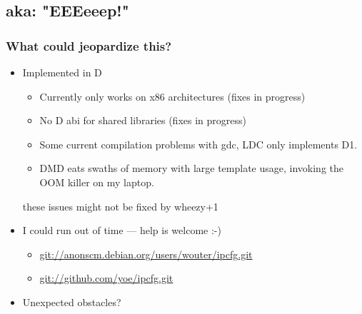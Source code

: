 \documentclass[ignorenonframetext]{beamer}
\begin{document}
\subsection{aka: "EEEeeep!"}
\begin{frame}
  \frametitle{What could jeopardize this?}
  \begin{itemize}
    \item Implemented in D
    \begin{itemize}
      \item Currently only works on x86 architectures (fixes in progress)
      \item No D abi for shared libraries (fixes in progress)
      \item Some current compilation problems with gdc, LDC only implements D1.
      \item DMD eats swaths of memory with large template usage,
      invoking the OOM killer on my laptop.
    \end{itemize}

    these issues might not be fixed by wheezy+1

    \item I could run out of time --- help is welcome :-)
    \begin{itemize}
      \item \url{git://anonscm.debian.org/users/wouter/ipcfg.git}
      \item \url{git://github.com/yoe/ipcfg.git}
    \end{itemize}
    \item Unexpected obstacles?
  \end{itemize}
\end{frame}
\end{document}
